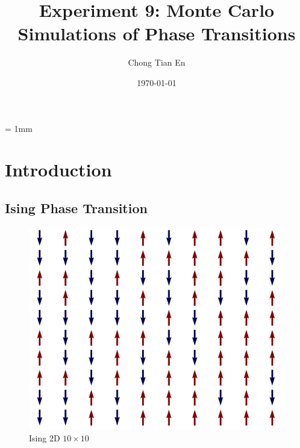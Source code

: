 \documentclass[a4paper]{article}
\title{Experiment 9: Monte Carlo Simulations of Phase Transitions}
\author{Chong Tian En}
\date{\today}
\numberwithin{equation}{section}
\begin{document}
\unitlength = 1mm
\maketitle

\section{Introduction}
\subsection{Ising Phase Transition}
\begin{figure}[H]
	\centering
	\includegraphics[scale=0.7]{2d_vector.png}
	\caption{Ising 2D $10\times10$}
	\label{fig:ising2d}
\end{figure}
\end{document}
